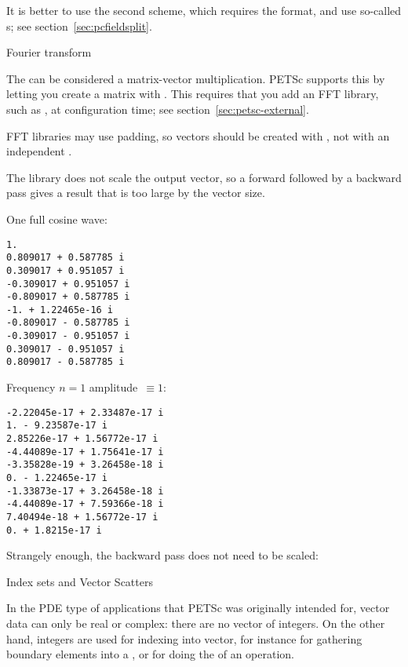 It is better to use the second scheme, which requires the
 format,
and use so-called s;
see section~\ref{sec:pcfieldsplit}.

 {Fourier transform}
\label{sec:petscfft}

The  can be considered a matrix-vector multiplication.
PETSc supports this by letting you create a matrix with .
This requires that you add an FFT library, such as ,
at configuration time; see section~\ref{sec:petsc-external}.

FFT libraries may use padding, so vectors should be created with
,
not with an independent .

The  library does not scale the output vector,
so a forward followed by a backward pass gives a result that is too large
by the vector size.


\begin{multicols}{2}
One full cosine wave:
\begin{verbatim}
1.
0.809017 + 0.587785 i
0.309017 + 0.951057 i
-0.309017 + 0.951057 i
-0.809017 + 0.587785 i
-1. + 1.22465e-16 i
-0.809017 - 0.587785 i
-0.309017 - 0.951057 i
0.309017 - 0.951057 i
0.809017 - 0.587785 i
\end{verbatim}
\columnbreak
Frequency $n=1$ amplitude~$\equiv1$:
\begin{verbatim}
-2.22045e-17 + 2.33487e-17 i
1. - 9.23587e-17 i
2.85226e-17 + 1.56772e-17 i
-4.44089e-17 + 1.75641e-17 i
-3.35828e-19 + 3.26458e-18 i
0. - 1.22465e-17 i
-1.33873e-17 + 3.26458e-18 i
-4.44089e-17 + 7.59366e-18 i
7.40494e-18 + 1.56772e-17 i
0. + 1.8215e-17 i
\end{verbatim}
\end{multicols}

Strangely enough, the backward pass does not need to be scaled:


 {Index sets and Vector Scatters}

In the \ac{PDE} type of applications that PETSc was originally intended for,
vector data can only be real or complex: there are no vector of integers.
On the other hand, integers are used for indexing into vector,
for instance for gathering boundary elements into a ,
or for doing the  of an  operation.

